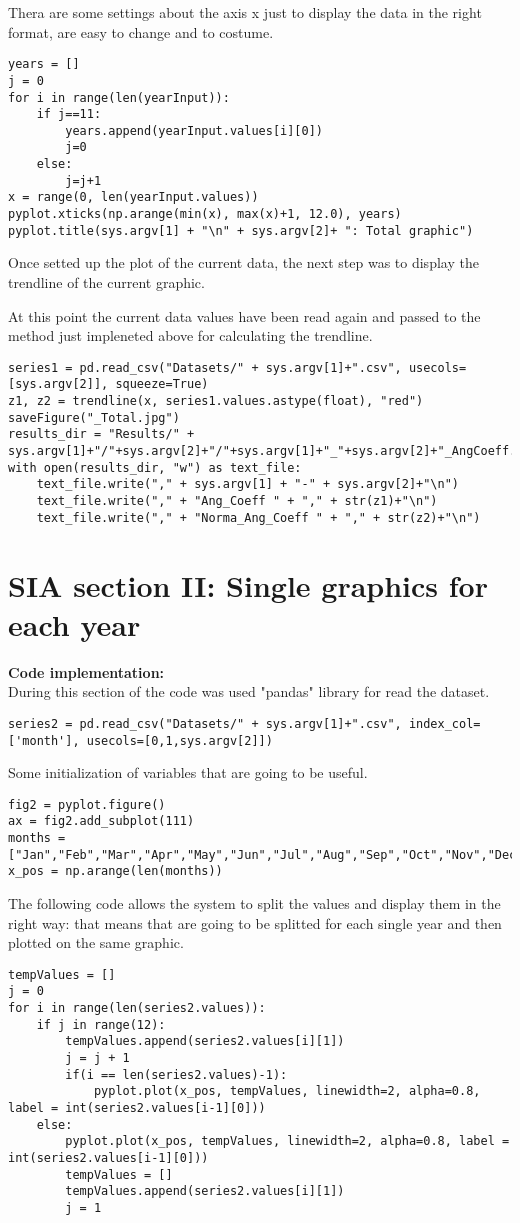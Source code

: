 Thera are some settings about the axis x just to display the data in the right format, are easy to change and to costume.
\begin{lstlisting}
years = []
j = 0
for i in range(len(yearInput)):
    if j==11:
        years.append(yearInput.values[i][0])
        j=0
    else:
        j=j+1 
x = range(0, len(yearInput.values))
pyplot.xticks(np.arange(min(x), max(x)+1, 12.0), years)
pyplot.title(sys.argv[1] + "\n" + sys.argv[2]+ ": Total graphic")
\end{lstlisting}

Once setted up the plot of the current data, the next step was to display the trendline of the current graphic.

At this point the current data values have been read again and passed to the method just impleneted above for calculating the trendline.
\begin{lstlisting}
series1 = pd.read_csv("Datasets/" + sys.argv[1]+".csv", usecols=[sys.argv[2]], squeeze=True)
z1, z2 = trendline(x, series1.values.astype(float), "red")
saveFigure("_Total.jpg")
results_dir = "Results/" + sys.argv[1]+"/"+sys.argv[2]+"/"+sys.argv[1]+"_"+sys.argv[2]+"_AngCoeff.csv"
with open(results_dir, "w") as text_file:
	text_file.write("," + sys.argv[1] + "-" + sys.argv[2]+"\n")
	text_file.write("," + "Ang_Coeff " + "," + str(z1)+"\n")
	text_file.write("," + "Norma_Ang_Coeff " + "," + str(z2)+"\n")
\end{lstlisting}

\section{SIA section II: Single graphics for each year}
\label{SIA_section_II}
\textbf{Code implementation:}\\
During this section of the code was used "pandas" library for read the dataset.
\begin{lstlisting}
series2 = pd.read_csv("Datasets/" + sys.argv[1]+".csv", index_col=['month'], usecols=[0,1,sys.argv[2]])
\end{lstlisting}

Some initialization of variables that are going to be useful.
\begin{lstlisting}
fig2 = pyplot.figure()
ax = fig2.add_subplot(111)
months = ["Jan","Feb","Mar","Apr","May","Jun","Jul","Aug","Sep","Oct","Nov","Dec"]
x_pos = np.arange(len(months))
\end{lstlisting}

The following code allows the system to split the values and display them in the right way: that means that are going to be splitted for each single year and then plotted on the same graphic.
\begin{lstlisting}
tempValues = []
j = 0
for i in range(len(series2.values)):
	if j in range(12):
		tempValues.append(series2.values[i][1])
		j = j + 1
		if(i == len(series2.values)-1):
			pyplot.plot(x_pos, tempValues, linewidth=2, alpha=0.8, label = int(series2.values[i-1][0]))
	else:
		pyplot.plot(x_pos, tempValues, linewidth=2, alpha=0.8, label = int(series2.values[i-1][0]))
		tempValues = []
		tempValues.append(series2.values[i][1])
		j = 1
\end{lstlisting}


